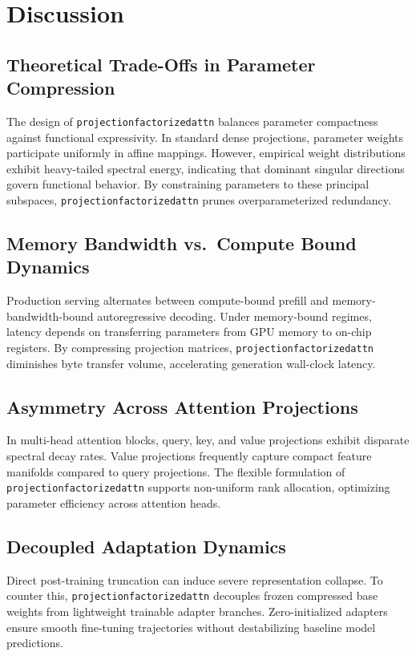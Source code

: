 \section{Discussion}

\subsection{Theoretical Trade-Offs in Parameter Compression}
The design of \texttt{projectionfactorizedattn} balances parameter compactness against functional expressivity. In standard dense projections, parameter weights participate uniformly in affine mappings. However, empirical weight distributions exhibit heavy-tailed spectral energy, indicating that dominant singular directions govern functional behavior. By constraining parameters to these principal subspaces, \texttt{projectionfactorizedattn} prunes overparameterized redundancy.

\subsection{Memory Bandwidth vs.\ Compute Bound Dynamics}
Production serving alternates between compute-bound prefill and memory-bandwidth-bound autoregressive decoding. Under memory-bound regimes, latency depends on transferring parameters from GPU memory to on-chip registers. By compressing projection matrices, \texttt{projectionfactorizedattn} diminishes byte transfer volume, accelerating generation wall-clock latency.

\subsection{Asymmetry Across Attention Projections}
In multi-head attention blocks, query, key, and value projections exhibit disparate spectral decay rates. Value projections frequently capture compact feature manifolds compared to query projections. The flexible formulation of \texttt{projectionfactorizedattn} supports non-uniform rank allocation, optimizing parameter efficiency across attention heads.

\subsection{Decoupled Adaptation Dynamics}
Direct post-training truncation can induce severe representation collapse. To counter this, \texttt{projectionfactorizedattn} decouples frozen compressed base weights from lightweight trainable adapter branches. Zero-initialized adapters ensure smooth fine-tuning trajectories without destabilizing baseline model predictions.

